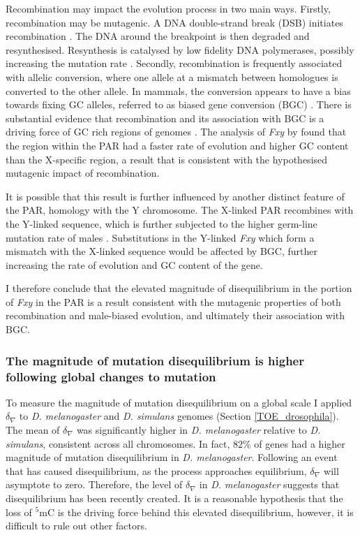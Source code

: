 Recombination may impact the evolution process in two main ways. Firstly, recombination may be mutagenic. A DNA double-strand break (DSB) initiates recombination \citep{Keeney2001MechanismInitiation}. The DNA around the breakpoint is then degraded and resynthesised. Resynthesis is catalysed by low fidelity DNA polymerases, possibly increasing the mutation rate \citep{Rattray2003Error-proneAhead}. Secondly, recombination is frequently associated with allelic conversion, where one allele at a mismatch between homologues is converted to the other allele. In mammals, the conversion appears to have a bias towards fixing GC alleles, referred to as biased gene conversion (BGC) \citep{Birdsell2002IntegratingEvolution, Eyre-Walker1999EvidenceDNA., Mancera2008High-resolutionYeast}. There is substantial evidence that recombination and its association with BGC is a driving force of GC rich regions of genomes \citep{Meunier2004RecombinationGenome, Berglund2009HotspotsGenes,Galtier2009GC-biasedPrimates}. The analysis of \textit{Fxy} by \cite{Montoya-Burgos2003RecombinationGenomes} found that the region within the PAR had a faster rate of evolution and higher GC content than the X-specific region, a result that is consistent with the hypothesised mutagenic impact of recombination. 

It is possible that this result is further influenced by another distinct feature of the PAR, homology with the Y chromosome. The X-linked PAR recombines with the Y-linked sequence, which is further subjected to the higher germ-line mutation rate of males \citep{Huttley2000HowMutagenesis}. Substitutions in the Y-linked \textit{Fxy} which form a mismatch with the X-linked sequence would be affected by BGC, further increasing the rate of evolution and GC content of the gene. 

I therefore conclude that the elevated magnitude of disequilibrium in the portion of \textit{Fxy} in the PAR is a result consistent with the mutagenic properties of both recombination and male-biased evolution, and ultimately their association with BGC. 

\subsubsection{The magnitude of mutation disequilibrium is higher following global changes to mutation}

To measure the magnitude of mutation disequilibrium on a global scale I applied $\delta_\nabla$ to \textit{D. melanogaster} and \textit{D. simulans} genomes (Section \ref{TOE_drosophila}). The mean of $\delta_\nabla$ was significantly higher in \textit{D. melanogaster} relative to \textit{D. simulans}, consistent across all chromosomes. In fact, $82$\% of genes had a higher magnitude of mutation disequilibrium in \textit{D. melanogaster}. Following an event that has caused disequilibrium, as the process approaches equilibrium, $\delta_\nabla$ will asymptote to zero. Therefore, the level of $\delta_\nabla$ in \textit{D. melanogaster} suggests that disequilibrium has been recently created. It is a reasonable hypothesis that the loss of $^5$mC is the driving force behind this elevated disequilibrium, however, it is difficult to rule out other factors. 


